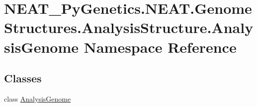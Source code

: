 \hypertarget{namespaceNEAT__PyGenetics_1_1NEAT_1_1GenomeStructures_1_1AnalysisStructure_1_1AnalysisGenome}{}\section{N\+E\+A\+T\+\_\+\+Py\+Genetics.\+N\+E\+A\+T.\+Genome\+Structures.\+Analysis\+Structure.\+Analysis\+Genome Namespace Reference}
\label{namespaceNEAT__PyGenetics_1_1NEAT_1_1GenomeStructures_1_1AnalysisStructure_1_1AnalysisGenome}
\subsection*{Classes}
\begin{DoxyCompactItemize}
\item 
class \hyperlink{classNEAT__PyGenetics_1_1NEAT_1_1GenomeStructures_1_1AnalysisStructure_1_1AnalysisGenome_1_1AnalysisGenome}{Analysis\+Genome}
\end{DoxyCompactItemize}
